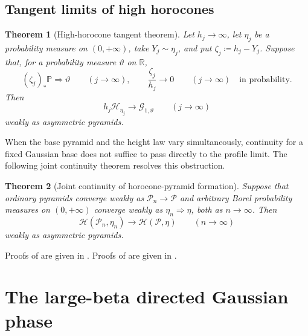 \documentclass[10pt,a4paper]{amsart}
\numberwithin{equation}{section}
\newtheorem{theorem}{Theorem}[section]
\newcommand{\R}{\mathbb R}
\begin{document}
\subsection{Tangent limits of high horocones}

\begin{theorem}[High-horocone tangent theorem]\label{thm:horocone-tangent}
Let $h_j\to\infty$, let $\eta_j$ be a probability measure on $(0,+\infty)$, take $Y_j\sim\eta_j$, and put
$\zeta_j\coloneqq h_j-Y_j$.  Suppose that, for a probability measure $\vartheta$ on $\R$,
\begin{equation}\label{eq:tangent-height-assumptions}
 (\zeta_j)_*\mathbb P\Rightarrow\vartheta\qquad(j\to\infty),
 \qquad
 \frac{\zeta_j}{h_j}\longrightarrow0\qquad(j\to\infty)
 \quad\text{in probability}.
\end{equation}
Then
\begin{equation}\label{eq:horocone-tangent-limit}
 h_j\mathcal H_{\eta_j}\longrightarrow\mathcal G_{1,\vartheta}\qquad(j\to\infty)
\end{equation}
weakly as asymmetric pyramids.
\end{theorem}

When the base pyramid and the height law vary simultaneously, continuity for a fixed Gaussian base does not suffice to
pass directly to the profile limit.  The following joint continuity theorem resolves this obstruction.

\begin{theorem}[Joint continuity of horocone-pyramid formation]
\label{thm:joint-horocone-pyramid-continuity}
Suppose that ordinary pyramids converge weakly as $\mathcal P_n\to\mathcal P$ and arbitrary Borel probability measures on
$(0,+\infty)$ converge weakly as $\eta_n\Rightarrow\eta$, both as $n\to\infty$.  Then
\begin{equation}\label{eq:joint-horocone-pyramid-continuity}
 \mathcal H(\mathcal P_n,\eta_n)
 \longrightarrow\mathcal H(\mathcal P,\eta)
 \qquad(n\to\infty)
\end{equation}
weakly as asymmetric pyramids.
\end{theorem}

Proofs of
are given in .  Proofs of
 are given in
.

\section{The large-beta directed Gaussian phase}\label{sec:large-beta}
\end{document}
